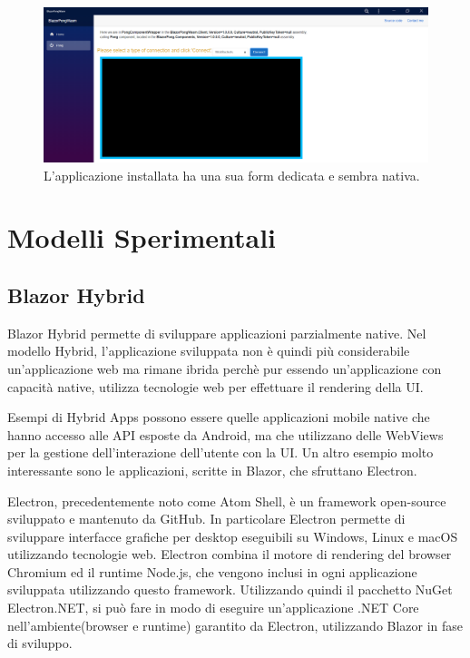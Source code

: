 \begin{figure}[H]
	\centerline{\includegraphics[scale=0.25]{figure/installedBlazorPongWasm.png}}
	\caption{L'applicazione installata ha una sua form dedicata e sembra nativa.}
	\label{fig:installedBlazorPongWasm}
\end{figure}

\pagebreak

\section{Modelli Sperimentali}
\subsection{Blazor Hybrid}\label{sez:bhybrid}
Blazor Hybrid permette di sviluppare applicazioni parzialmente native.
Nel modello Hybrid, l'applicazione sviluppata non \`e quindi pi\`u considerabile un'applicazione web ma rimane ibrida perch\`e pur essendo un'applicazione con capacit\`a native, utilizza tecnologie web per effettuare il rendering della UI.

Esempi di Hybrid Apps possono essere quelle applicazioni mobile native che hanno accesso alle API esposte da Android, ma che utilizzano delle WebViews per la gestione dell'interazione dell'utente con la UI.
Un altro esempio molto interessante sono le applicazioni, scritte in Blazor, che sfruttano Electron.

Electron, precedentemente noto come Atom Shell, \`e un framework open-source sviluppato e mantenuto da GitHub.
In particolare Electron permette di sviluppare interfacce grafiche per desktop eseguibili su Windows, Linux e macOS utilizzando tecnologie web\cite{electronWiki}.
Electron combina il motore di rendering del browser Chromium ed il runtime Node.js, che vengono inclusi in ogni applicazione sviluppata utilizzando questo framework.
Utilizzando quindi il pacchetto NuGet Electron.NET, si pu\`o fare in modo di eseguire un'applicazione .NET Core nell'ambiente(browser e runtime) garantito da Electron, utilizzando Blazor in fase di sviluppo\cite{electronDotNet}.

